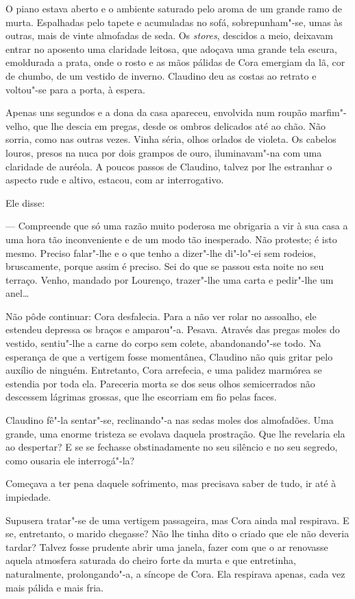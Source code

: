 O piano estava aberto e o ambiente saturado pelo aroma de um grande ramo
de murta. Espalhadas pelo tapete e acumuladas no sofá, sobrepunham"-se,
umas às outras, mais de vinte almofadas de seda. Os \emph{stores},
descidos a meio, deixavam entrar no aposento uma claridade leitosa, que
adoçava uma grande tela escura, emoldurada a prata, onde o rosto e as
mãos pálidas de Cora emergiam da lã, cor de chumbo, de um vestido de
inverno. Claudino deu as costas ao retrato e voltou"-se para a porta, à
espera.

Apenas uns segundos e a dona da casa apareceu, envolvida num roupão
marfim"-velho, que lhe descia em pregas, desde os ombros delicados até ao
chão. Não sorria, como nas outras vezes. Vinha séria, olhos orlados de
violeta. Os cabelos louros, presos na nuca por dois grampos de ouro,
iluminavam"-na com uma claridade de auréola. A poucos passos de Claudino,
talvez por lhe estranhar o aspecto rude e altivo, estacou, com ar
interrogativo.

Ele disse:

--- Compreende que só uma razão muito poderosa me obrigaria a vir à sua
casa a uma hora tão inconveniente e de um modo tão inesperado. Não
proteste; é isto mesmo. Preciso falar"-lhe e o que tenho a dizer"-lhe
di"-lo"-ei sem rodeios, bruscamente, porque assim é preciso. Sei do que se
passou esta noite no seu terraço. Venho, mandado por Lourenço,
trazer"-lhe uma carta e pedir"-lhe um anel\ldots{}

Não pôde continuar: Cora desfalecia. Para a não ver rolar no assoalho,
ele estendeu depressa os braços e amparou"-a. Pesava. Através das pregas
moles do vestido, sentiu"-lhe a carne do corpo sem colete, abandonando"-se
todo. Na esperança de que a vertigem fosse momentânea, Claudino não quis
gritar pelo auxílio de ninguém. Entretanto, Cora arrefecia, e uma
palidez marmórea se estendia por toda ela. Pareceria morta se dos seus
olhos semicerrados não descessem lágrimas grossas, que lhe escorriam
em fio pelas faces.

Claudino fê"-la sentar"-se, reclinando"-a nas sedas moles dos almofadões.
Uma grande, uma enorme tristeza se evolava daquela prostração. Que lhe
revelaria ela ao despertar? E se se fechasse obstinadamente no seu
silêncio e no seu segredo, como ousaria ele interrogá"-la?

Começava a ter pena daquele sofrimento, mas precisava saber de tudo, ir
até à impiedade.

Supusera tratar"-se de uma vertigem passageira, mas Cora ainda mal
respirava. E se, entretanto, o marido chegasse? Não lhe tinha dito o
criado que ele não deveria tardar? Talvez fosse prudente abrir uma
janela, fazer com que o ar renovasse aquela atmosfera saturada do cheiro
forte da murta e que entretinha, naturalmente, prolongando"-a, a síncope
de Cora. Ela respirava apenas, cada vez mais pálida e mais fria.

